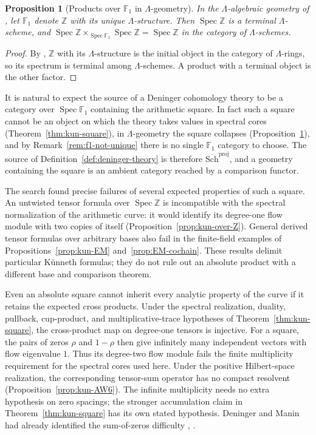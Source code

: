 \documentclass[11pt]{amsart}
\theoremstyle{plain}
\newtheorem{proposition}[theorem]{Proposition}
\theoremstyle{definition}
\theoremstyle{remark}
\numberwithin{equation}{section}
\newcommand{\Z}{\mathbb{Z}}
\newcommand{\F}{\mathbb{F}}
\newcommand{\Schbar}{\overline{\mathrm{Sch}}}
\DeclareMathOperator{\Spec}{Spec}
\begin{document}
\begin{proposition}[Products over $\F_1$ in $\Lambda$-geometry]
\label{prop:borger-square}
In the $\Lambda$-algebraic geometry of \cite{Borger2009Lambda}, let
$\F_1$ denote $\Z$ with its unique $\Lambda$-structure. Then
$\Spec\Z$ is a terminal $\Lambda$-scheme, and
$\Spec\Z\times_{\Spec\F_1}\Spec\Z=\Spec\Z$ in the category of
$\Lambda$-schemes.
\end{proposition}

\begin{proof}
By \cite[p.~2]{Borger2009Lambda}, $\Z$ with its $\Lambda$-structure is
the initial object in the category of $\Lambda$-rings, so its spectrum
is terminal among $\Lambda$-schemes. A product with a terminal object
is the other factor.
\end{proof}

It is natural to expect the source of a Deninger cohomology theory to
be a category over $\Spec\F_1$ containing the arithmetic square. In
fact such a square cannot be an object on which the theory takes
values in spectral cores (Theorem~\ref{thm:kun-square}), in
$\Lambda$-geometry the square collapses
(Proposition~\ref{prop:borger-square}), and by
Remark~\ref{rem:f1-not-unique} there is no single $\F_1$ category to
choose. The source of Definition~\ref{def:deninger-theory} is
therefore $\Schbar^{\mathrm{proj}}$, and a geometry containing the
square is an ambient category reached by a comparison functor.

The search found precise failures of several expected properties of
such a square. An untwisted tensor formula over $\Spec\Z$ is
incompatible with the spectral normalization of the arithmetic curve:
it would identify its degree-one flow module with two copies of itself
(Proposition~\ref{prop:kun-over-Z}). General derived tensor formulas
over arbitrary bases also fail in the finite-field examples of
Propositions~\ref{prop:kun-EM} and~\ref{prop:EM-cochain}.
These results delimit particular K\"unneth formulas; they do not rule
out an absolute product with a different base and comparison theorem.

Even an absolute square cannot inherit every analytic property of the
curve if it retains the expected cross products. Under the spectral
realization, duality, pullback, cup-product, and multiplicative-trace
hypotheses of Theorem~\ref{thm:kun-square}, the cross-product map on
degree-one tensors is injective. For a square, the pairs of zeros
$\rho$ and $1-\rho$ then give infinitely many independent vectors with
flow eigenvalue $1$. Thus its degree-two flow module fails the finite
multiplicity requirement for the spectral cores used here. Under the
positive Hilbert-space realization, the corresponding tensor-sum
operator has no compact resolvent
(Proposition~\ref{prop:kun-AW6}). The infinite multiplicity needs no
extra hypothesis on zero spacings; the stronger accumulation claim in
Theorem~\ref{thm:kun-square} has its own stated hypothesis. Deninger and
Manin had already identified the sum-of-zeros difficulty
\cite[(7.32), pp.~41--42]{Deninger1994Motivic},
\cite[p.~132]{Manin1995Lectures}.
\end{document}
